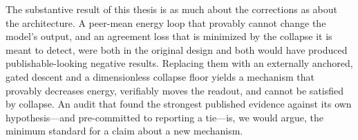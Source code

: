 \documentclass[11pt,a4paper]{article}
\theoremstyle{plain}
\theoremstyle{definition}
\theoremstyle{remark}
\begin{document}
\noindent
The substantive result of this thesis is as much about the corrections as
about the architecture. A peer-mean energy loop that provably cannot change the
model's output, and an agreement loss that is minimized by the collapse it is
meant to detect, were both in the original design and both would have produced
publishable-looking negative results. Replacing them with an externally
anchored, gated descent and a dimensionless collapse floor yields a mechanism
that provably decreases energy, verifiably moves the readout, and cannot be
satisfied by collapse. An audit that found the strongest published evidence
against its own hypothesis---and pre-committed to reporting a tie---is, we
would argue, the minimum standard for a claim about a new mechanism.

\end{document}
